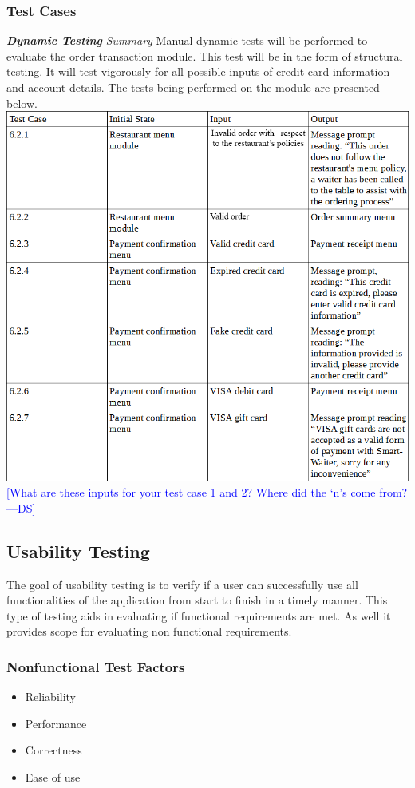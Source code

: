 \documentclass[12pt]{article}
\newcommand{\authornote}[3]{\textcolor{#1}{[#3 ---#2]}}
\newcommand{\authornote}[3]{}
\newcommand{\ds}[1]{\authornote{blue}{DS}{#1}}
\begin{document}
\subsubsection{Test Cases}
\textbf{\textit{Dynamic Testing}}\newline
\newline
\textit{Summary}\newline
Manual dynamic tests will be performed to evaluate the order transaction module. This test will be in the form of structural testing. It will test vigorously for all possible inputs of credit card information and account details. The tests being performed on the module are presented below. 
\newline
\includegraphics[width=\textwidth,height=\textheight,keepaspectratio]{orderTransactionTC.png}
\ds{What are these inputs for your test case 1 and 2? Where did the `n's come from?}
\subsection{Usability Testing}
The goal of usability testing is to verify if a user can successfully use all functionalities of the application from start to finish in a timely manner. This type of testing aids in evaluating if functional requirements are met. As well it provides scope for evaluating non functional requirements.
\subsubsection{Nonfunctional Test Factors}
\begin{itemize}
  \item Reliability 
  \item Performance
  \item 	Correctness
  \item 	Ease of use
\end{itemize}
\end{document}
